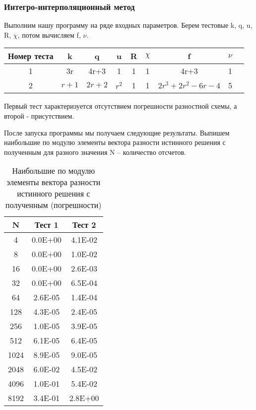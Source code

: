 \subsubsection{Интегро-интерполяционный метод}

Выполним нашу программу на ряде входных параметров. Берем тестовые k, q, u, R, $\chi$, потом вычисляем f, $\nu$.

\begin{table}[H]
  \centering
  \begin{tabular}{ c | *{8}c }
    \toprule
    Номер теста & k & q & u & R & $\chi $ & f & $\nu $ \\
    \midrule
    1 & 3r & 4r+3 & 1 & 1 & 1 & 4r+3 & 1 \\
    \midrule
    2 & $ r+1 $ & $ 2r+2 $ & $ r^2 $ & 1 & 1 & $ 2r^3+2r^2-6r-4 $ & 5 \\
    \bottomrule
  \end{tabular}
\end{table}

Первый тест характеризуется отсутствием погрешности разностной схемы, а второй - присутствием.

После запуска программы мы получаем следующие результаты. Выпишем наибольшие по модулю элементы вектора разности истинного решения с полученным для разного значения N – количество отсчетов.

  \begin{table}[H]
    \centering
    \begin{tabular}{c | c | c}
      \toprule
      N & Тест 1 & Тест 2 \\
      \midrule
4 & 0.0E+00 & 4.1E-02 \\
8 & 0.0E+00 & 1.0E-02 \\
16 & 0.0E+00 & 2.6E-03 \\
32 & 0.0E+00 & 6.5E-04 \\
64 & 2.6E-05 & 1.4E-04 \\
128 & 4.3E-05 & 2.4E-05 \\
256 & 1.0E-05 & 3.9E-05 \\
512 & 6.1E-05 & 6.4E-05 \\
1024 & 8.9E-05 & 9.0E-05 \\
2048 & 6.0E-02 & 4.5E-02 \\
4096 & 1.0E-01 & 5.4E-02 \\
8192 & 3.4E-01 & 2.8E+00 \\

      \bottomrule
    \end{tabular}
    \caption{Наибольшие по модулю элементы вектора разности истинного решения с полученным (погрешности)}
  \end{table}

